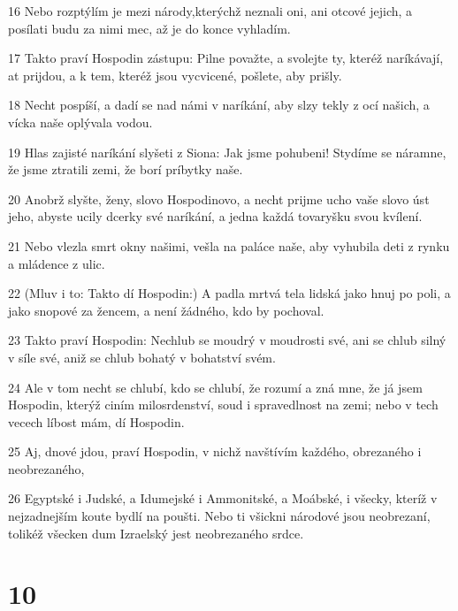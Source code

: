 \par 16 Nebo rozptýlím je mezi národy,kterýchž neznali oni, ani otcové jejich, a posílati budu za nimi mec, až je do konce vyhladím.
\par 17 Takto praví Hospodin zástupu: Pilne považte, a svolejte ty, kteréž naríkávají, at prijdou, a k tem, kteréž jsou vycvicené, pošlete, aby prišly.
\par 18 Necht pospíší, a dadí se nad námi v naríkání, aby slzy tekly z ocí našich, a vícka naše oplývala vodou.
\par 19 Hlas zajisté naríkání slyšeti z Siona: Jak jsme pohubeni! Stydíme se náramne, že jsme ztratili zemi, že borí príbytky naše.
\par 20 Anobrž slyšte, ženy, slovo Hospodinovo, a necht prijme ucho vaše slovo úst jeho, abyste ucily dcerky své naríkání, a jedna každá tovaryšku svou kvílení.
\par 21 Nebo vlezla smrt okny našimi, vešla na paláce naše, aby vyhubila deti z rynku a mládence z ulic.
\par 22 (Mluv i to: Takto dí Hospodin:) A padla mrtvá tela lidská jako hnuj po poli, a jako snopové za žencem, a není žádného, kdo by pochoval.
\par 23 Takto praví Hospodin: Nechlub se moudrý v moudrosti své, ani se chlub silný v síle své, aniž se chlub bohatý v bohatství svém.
\par 24 Ale v tom necht se chlubí, kdo se chlubí, že rozumí a zná mne, že já jsem Hospodin, kterýž ciním milosrdenství, soud i spravedlnost na zemi; nebo v tech vecech líbost mám, dí Hospodin.
\par 25 Aj, dnové jdou, praví Hospodin, v nichž navštívím každého, obrezaného i neobrezaného,
\par 26 Egyptské i Judské, a Idumejské i Ammonitské, a Moábské, i všecky, kteríž v nejzadnejším koute bydlí na poušti. Nebo ti všickni národové jsou neobrezaní, tolikéž všecken dum Izraelský jest neobrezaného srdce.

\chapter{10}

